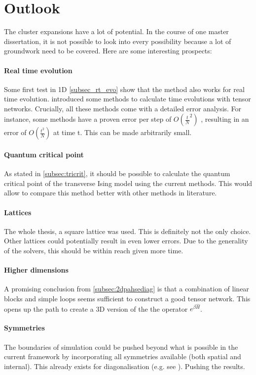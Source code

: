 \section{Outlook}

The cluster expansions have a lot of potential. In the course of one master dissertation, it is not possible to look into every possibility because a lot of groundwork need to be covered. Here are some interesting prospects: 

\paragraph{Real time evolution}

Some first test in 1D \cref{subsec_rt_evo} show that the method also works for real time evolution.  introduced some methods to calculate time evolutions with tensor networks. Crucially, all these methods come with a detailed error analysis. For instance, some methods have a proven error per step of $O \left( \frac{t}{N}^2  \right)$ , resulting in an error of $O \left( \frac{t^2}{N}  \right)$ at time t. This can be made arbitrarily small.

\paragraph{Quantum critical point}

As stated in \cref{subsec:tricrit}, it should be possible to calculate the quantum critical point of the transverse Ising model using the current methods. This would allow to compare this method better with other methods in literature.

\paragraph{Lattices}

The whole thesis, a square lattice was used. This is definitely not the only choice. Other lattices could potentially result in even lower errors. Due to the generality of the solvers, this should be within reach given more time.

\paragraph{Higher dimensions}

A promising conclusion from \cref{subsec:2dpahsediag} is that a combination of linear blocks and simple loops seems sufficient to construct a good tensor network. This opens up the path to create a 3D version of the the operator $e^{\beta \hat{H}}$.  

\paragraph{Symmetries}

The boundaries of simulation could be pushed beyond what is possible in the current framework by incorporating all symmetries available (both spatial and internal). This already exists for diagonalisation (e.g. see \cite{Wietek2018}). Pushing the results.

